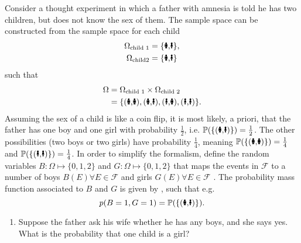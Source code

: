 \begin{example}
	Consider a thought experiment in which a father with amnesia is told he has two children, but does not know the sex of them. The sample space can be constructed from the sample space for each child
	\begin{equation}
		\begin{split}
			\Omega_{\text{child 1}} &= \{\text{\Gentsroom,\Ladiesroom}\},\\
			\Omega_{\text{child2}} &= \{\text{\Gentsroom,\Ladiesroom}\}\\
		\end{split}
	\end{equation}
	such that
	\begin{equation}
		\begin{split}
			\Omega &= \Omega_{\text{child 1}}\times \Omega_{\text{child 2}}\\
			&= \{(\text{\Gentsroom,\Gentsroom}),(\text{\Gentsroom,\Ladiesroom}),(\text{\Ladiesroom,\Gentsroom}),(\text{\Ladiesroom,\Ladiesroom})\}.
		\end{split}
	\end{equation}
	Assuming the sex of a child is like a coin flip, it is most likely, a priori, that the father has one boy and one girl with probability $\frac{1}{2}$, i.e.  $\mathbb{P}(\{(\text{\Gentsroom,\Ladiesroom})\})=\frac{1}{2}$. The other possibilities (two boys or two girls) have probability $\frac{1}{4}$, meaning $\mathbb{P}(\{(\text{\Gentsroom,\Gentsroom})\})=\frac{1}{4}$ and $\mathbb{P}(\{(\text{\Ladiesroom,\Ladiesroom})\})=\frac{1}{4}$. In order to simplify the formalism, define the random variables $B: \Omega \mapsto \{0,1,2\}$ and $G: \Omega \mapsto \{0,1,2\}$ that maps the events in $\mathcal{F}$ to a number of boys $B(E)\forall E\in \mathcal{F}$ and girls $G(E)\forall E\in \mathcal{F}$ . The probability mass function associated to $B$ and $G$ is given by , such that e.g.
	\begin{equation}
		p(B = 1, G = 1)= \mathbb{P}(\{(\text{\Gentsroom,\Ladiesroom})\}).
	\end{equation}

	\begin{enumerate}
		\item Suppose the father ask his wife whether he has any boys, and she says yes. What is the probability that one child is a girl?
		

\end{enumerate}
\end{example}
